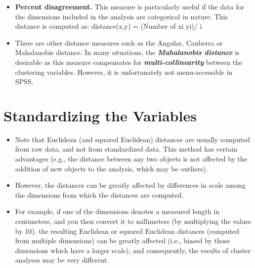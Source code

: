 \documentclass[a4paper,12pt]{report}
\begin{document}
\begin{itemize}
\item \textbf{Percent disagreement.} This measure is particularly useful if the data for the dimensions included in the analysis are categorical in nature. This distance is computed as:
distance(x,y) = (Number of xi  yi)/ i
	\item There are other distance measures such as the Angular, Canberra or Mahalanobis
	distance. In many situations, the \textbf{\textit{Mahalanobis
			distance}} is desirable as this measure compensates for \textbf{\textit{multi-collinearity}}
	between the clustering variables. However, it is unfortunately not menu-accessible
	in SPSS.
\end{itemize}
\section{Standardizing the Variables}
\begin{itemize}
\item Note that Euclidean (and squared Euclidean) distances are usually computed from raw data, and not from standardized data. This method has certain advantages (e.g., the distance between any two objects is not affected by the addition of new objects to the analysis, which may be outliers). 
\item However, the distances can be greatly affected by differences in scale among the dimensions from which the distances are computed. 
\item 
For example, if one of the dimensions denotes a measured length in centimeters, and you then convert it to millimeters (by multiplying the values by 10), the resulting Euclidean or squared Euclidean distances (computed from multiple dimensions) can be greatly affected (i.e., biased by those dimensions which have a larger scale), and consequently, the results of cluster analyses may be very different. 
\end{itemize}
\end{document}
